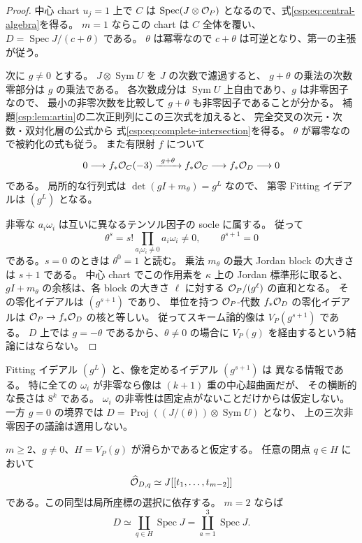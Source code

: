 \begin{proof}
中心 chart $u_j=1$ 上で $C$ は $\operatorname{Spec}(J\otimes\mathcal O_P)$
となるので、式\eqref{csp:eq:central-algebra}を得る。
$m=1$ ならこの chart は $C$ 全体を覆い、
$D=\operatorname{Spec}J/(c+\theta)$ である。
$\theta$ は冪零なので $c+\theta$ は可逆となり、第一の主張が従う。

次に $g\ne0$ とする。
$J\otimes\operatorname{Sym}U$ を $J$ の次数で濾過すると、
$g+\theta$ の乗法の次数零部分は $g$ の乗法である。
各次数成分は $\operatorname{Sym}U$ 上自由であり、$g$ は非零因子なので、
最小の非零次数を比較して $g+\theta$ も非零因子であることが分かる。
補題\ref{csp:lem:artin}の二次正則列にこの三次式を加えると、
完全交叉の次元・次数・双対化層の公式から
式\eqref{csp:eq:complete-intersection}を得る。
$\theta$ が冪零なので被約化の式も従う。
また有限射 $f$ について
\begin{equation}\label{csp:eq:pushforward-sequence}
 0\longrightarrow f_*\mathcal O_C(-3)
 \xrightarrow{\ g+\theta\ } f_*\mathcal O_C
 \longrightarrow f_*\mathcal O_D\longrightarrow0
\end{equation}
である。
局所的な行列式は $\det(gI+m_\theta)=g^L$ なので、
第零 Fitting イデアルは $(g^L)$ となる。

非零な $a_i\omega_i$ は互いに異なるテンソル因子の socle に属する。
従って
\[
 \theta^s=s!\prod_{a_i\omega_i\ne0}a_i\omega_i\ne0,
 \qquad \theta^{s+1}=0
\]
である。$s=0$ のときは $\theta^0=1$ と読む。
乗法 $m_\theta$ の最大 Jordan block の大きさは $s+1$ である。
中心 chart でこの作用素を $\kappa$ 上の Jordan 標準形に取ると、
$gI+m_\theta$ の余核は、各 block の大きさ $\ell$ に対する
$\mathcal O_P/(g^\ell)$ の直和となる。
その零化イデアルは $(g^{s+1})$ であり、
単位を持つ $\mathcal O_P$-代数 $f_*\mathcal O_D$ の零化イデアルは
$\mathcal O_P\to f_*\mathcal O_D$ の核と等しい。
従ってスキーム論的像は $V_P(g^{s+1})$ である。
$D$ 上では $g=-\theta$ であるから、$\theta\ne0$ の場合に
$V_P(g)$ を経由するという結論にはならない。
\end{proof}

Fitting イデアル $(g^L)$ と、像を定めるイデアル $(g^{s+1})$ は
異なる情報である。
特に全ての $\omega_i$ が非零なら像は $(k+1)$ 重の中心超曲面だが、
その横断的な長さは $8^k$ である。
$\omega_i$ の非零性は固定点がないことだけからは仮定しない。
一方 $g=0$ の境界では
$D=\operatorname{Proj}((J/(\theta))\otimes\operatorname{Sym}U)$ となり、
上の三次非零因子の議論は適用しない。

\begin{proposition}
\label{csp:prop:local-artin}
$m\ge2$、$g\ne0$、$H=V_P(g)$ が滑らかであると仮定する。
任意の閉点 $q\in H$ において
\begin{equation}\label{csp:eq:completed-local}
 \widehat{\mathcal O}_{D,q}\simeq
 J[[t_1,\ldots,t_{m-2}]]
\end{equation}
である。この同型は局所座標の選択に依存する。
$m=2$ ならば
\begin{equation}\label{csp:eq:binary-central}
 D\simeq\coprod_{q\in H}\operatorname{Spec}J
       =\coprod_{a=1}^3\operatorname{Spec}J.
\end{equation}
\end{proposition}

